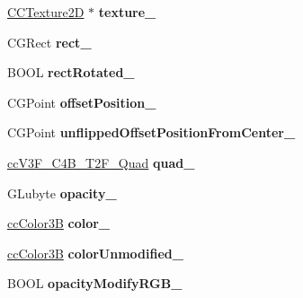 \begin{DoxyCompactItemize}
\item 
\hypertarget{class_c_c_sprite_af5c9280da7b7b2dadc3da61664d6d9a9}{\hyperlink{class_c_c_texture2_d}{C\-C\-Texture2\-D} $\ast$ {\bfseries texture\-\_\-}}\label{class_c_c_sprite_af5c9280da7b7b2dadc3da61664d6d9a9}

\item 
\hypertarget{class_c_c_sprite_a7881d1ba58e109cc5bd443cd5ce908d9}{C\-G\-Rect {\bfseries rect\-\_\-}}\label{class_c_c_sprite_a7881d1ba58e109cc5bd443cd5ce908d9}

\item 
\hypertarget{class_c_c_sprite_a7f4f804216ff8dd9b43643aaaf77d271}{B\-O\-O\-L {\bfseries rect\-Rotated\-\_\-}}\label{class_c_c_sprite_a7f4f804216ff8dd9b43643aaaf77d271}

\item 
\hypertarget{class_c_c_sprite_ae182d416096ae6a1a5466ce6e7c53290}{C\-G\-Point {\bfseries offset\-Position\-\_\-}}\label{class_c_c_sprite_ae182d416096ae6a1a5466ce6e7c53290}

\item 
\hypertarget{class_c_c_sprite_a4e8b1aa3d9ad5bd4630575d6c852a2de}{C\-G\-Point {\bfseries unflipped\-Offset\-Position\-From\-Center\-\_\-}}\label{class_c_c_sprite_a4e8b1aa3d9ad5bd4630575d6c852a2de}

\item 
\hypertarget{class_c_c_sprite_af27a167b3a56675e1059a62194e6928b}{\hyperlink{cc_types_8h_ab2642984bbb3d2fa1fe4fedb5657a065}{cc\-V3\-F\-\_\-\-C4\-B\-\_\-\-T2\-F\-\_\-\-Quad} {\bfseries quad\-\_\-}}\label{class_c_c_sprite_af27a167b3a56675e1059a62194e6928b}

\item 
\hypertarget{class_c_c_sprite_a24c72fb49af2f23b480187fd21cb82d4}{G\-Lubyte {\bfseries opacity\-\_\-}}\label{class_c_c_sprite_a24c72fb49af2f23b480187fd21cb82d4}

\item 
\hypertarget{class_c_c_sprite_a36ae3cb27a8767f86842cbaff55b6f4c}{\hyperlink{cc_types_8h_a829b00c53e72f0115e3880cb508fec1e}{cc\-Color3\-B} {\bfseries color\-\_\-}}\label{class_c_c_sprite_a36ae3cb27a8767f86842cbaff55b6f4c}

\item 
\hypertarget{class_c_c_sprite_a99a71951487dd36c965d87c7716ac7d8}{\hyperlink{cc_types_8h_a829b00c53e72f0115e3880cb508fec1e}{cc\-Color3\-B} {\bfseries color\-Unmodified\-\_\-}}\label{class_c_c_sprite_a99a71951487dd36c965d87c7716ac7d8}

\item 
\hypertarget{class_c_c_sprite_ae44669ad5a03d0b6f5e7c84c3e8b0e94}{B\-O\-O\-L {\bfseries opacity\-Modify\-R\-G\-B\-\_\-}}\label{class_c_c_sprite_ae44669ad5a03d0b6f5e7c84c3e8b0e94}


\end{DoxyCompactItemize}

